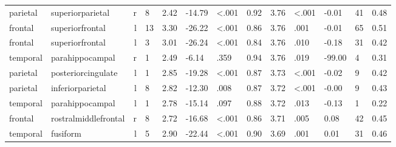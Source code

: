 \documentclass{article}
\begin{document}
\begin{longtable}{llrR{1.3cm}R{1cm}R{1.3cm}R{1cm}R{1cm}R{1.3cm}R{1cm}R{1.8cm}R{1.3cm}R{1.8cm}}
  parietal &          superiorparietal &    r &         8 &                  2.42 &           -14.79 &      \textless.001 &                               0.92 &                          3.76 &                   \textless.001 &  -0.01 &     41 &      0.48 \\
   frontal &           superiorfrontal &    l &        13 &                  3.30 &           -26.22 &      \textless.001 &                               0.86 &                          3.76 &                            .001 &  -0.01 &     65 &      0.51 \\
   frontal &           superiorfrontal &    l &         3 &                  3.01 &           -26.24 &      \textless.001 &                               0.84 &                          3.76 &                            .010 &  -0.18 &     31 &      0.42 \\
  temporal &           parahippocampal &    r &         1 &                  2.49 &            -6.14 &               .359 &                               0.94 &                          3.76 &                            .019 & -99.00 &      4 &      0.31 \\
  parietal &        posteriorcingulate &    l &         1 &                  2.85 &           -19.28 &      \textless.001 &                               0.87 &                          3.73 &                   \textless.001 &  -0.02 &      9 &      0.42 \\
  parietal &          inferiorparietal &    l &         8 &                  2.82 &           -12.30 &               .008 &                               0.87 &                          3.72 &                   \textless.001 &  -0.00 &      9 &      0.43 \\
  temporal &           parahippocampal &    l &         1 &                  2.78 &           -15.14 &               .097 &                               0.88 &                          3.72 &                            .013 &  -0.13 &      1 &      0.22 \\
   frontal &      rostralmiddlefrontal &    r &         8 &                  2.72 &           -16.68 &      \textless.001 &                               0.86 &                          3.71 &                            .005 &   0.08 &     42 &      0.45 \\
  temporal &                  fusiform &    l &         5 &                  2.90 &           -22.44 &      \textless.001 &                               0.90 &                          3.69 &                            .001 &   0.01 &     31 &      0.46 \\

\end{longtable}
\end{document}
